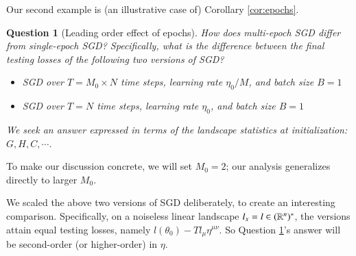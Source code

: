 \documentclass[anon,12pt]{colt2021} %
\newtheorem{quest}{Question}
\begin{document}
{            %
                Our second example is (an illustrative case of)
                Corollary \ref{cor:epochs}.
                \begin{quest}[Leading order effect of epochs]\label{qst:multi}
                    How does multi-epoch SGD differ from single-epoch SGD?
                    Specifically, what is the difference between the final
                    testing losses of the following two versions of SGD?
                    \begin{itemize}
                        \item SGD over $T=M_0 \times N$ time steps, learning rate $\eta_0/M$, and
                            batch size $B=1$
                        \item SGD over $T=N$ time steps, learning rate $\eta_0$, and batch size $B=1$
                    \end{itemize}
                    We seek an answer expressed in terms of the landscape statistics
                    at initialization: $G,H,C, \cdots$.
                \end{quest}
                To make our discussion concrete, we will set $M_0=2$; our analysis 
                generalizes directly to larger $M_0$.

                We scaled the above two versions of SGD deliberately, to create an
                interesting comparison.  Specifically, on a noiseless linear
                landscape $l_x=l \in (\mathbb{R}^n)^*$, the versions attain equal testing
                losses, namely $l(\theta_0) - T l_\mu \eta^{\mu\nu}$.
                So Question \ref{qst:multi}'s answer will be second-order (or
                higher-order) in $\eta$.



    \begin{landscape}

\end{landscape}}
\end{document}
